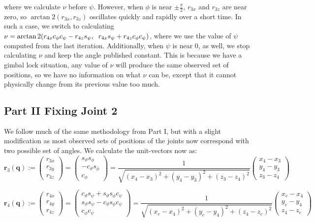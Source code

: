 \documentclass[11pt, a4paper]{article}
\begin{document}
    where we calculate $\nu$ before $\psi$. 
    However, when $\phi$ is near $\pm\frac{\pi}{2}$, 
    $r_{3x}$ and $r_{3z}$ are near zero, so $\arctan2(r_{3x}, r_{3z})$
    oscillates quickly and rapidly over a short time. %
    In such a case, we switch to calculating 
    $\nu = \arctan2(r_{4x}c_{\phi}c_{\psi} - r_{4z}s_{\psi}, \hspace{0.2cm}
                    r_{4x}s_{\psi} + r_{4z}c_{\phi}c_{\psi}
    )$, where we use the value of $\psi$ computed from the last iteration.
    Additionally, when $\psi$ is near $0$, as well, we stop calculating
    $\nu$ and keep the angle published constant. This is because we have
    a gimbal lock situation, any value of $\nu$ will produce the same observed
    set of positions, so we have no information on what $\nu$ can be, except
    that it cannot physically change from its previous value too much.


    \subsection{Part II \textemdash Fixing Joint 2}
    We follow much of the same methodology from Part I, but with a slight
    modification as most observed sets of positions of the joints now correspond
    with two possible set of angles. We calculate the unit-vectors now as:
    $$
    \textbf{r}_3(\textbf{q}) :=
    \begin{pmatrix}
        r_{3x}\\
        r_{3y}\\
        r_{3z} 
    \end{pmatrix} =
    \begin{pmatrix}
        s_{\vartheta}s_{\phi}\\
       -c_{\vartheta}s_{\phi}\\
        c_{\phi}
    \end{pmatrix} = \frac{1}{\sqrt{(x_4 - x_3)^2 + (y_4 - y_3)^2 + (z_3 - z_4)^2}}
    \begin{pmatrix}
        x_4 - x_3\\
        y_4 - y_3\\
        z_3 - z_4
    \end{pmatrix}
    $$

    $$
    \textbf{r}_4(\textbf{q}) :=
    \begin{pmatrix}
        r_{4x}\\
        r_{4y}\\
        r_{4z}
    \end{pmatrix} =
    \begin{pmatrix}
        c_{\vartheta}s_{\psi} + s_{\vartheta}s_{\phi}c_{\psi}\\
        s_{\vartheta}s_{\psi} - c_{\vartheta}s_{\phi}c_{\psi}\\
        c_{\phi}c_{\psi}
    \end{pmatrix} = \frac{1}{\sqrt{(x_e - x_4)^2 + (y_e - y_4)^2 + (z_4 - z_e)^2}}
    \begin{pmatrix}
        x_e - x_4\\
        y_e - y_4\\
        z_4 - z_e
    \end{pmatrix}
    $$
\end{document}
